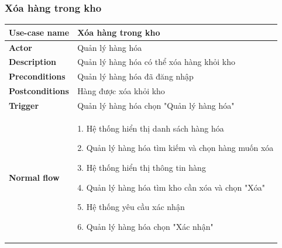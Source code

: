         \subsubsection{Xóa hàng trong kho}
        {
            \setlength\extrarowheight{6pt}
            \begin{longtable}{| p{} | p{} |} 
                \hline
                    \textbf{Use-case name} 
                & 
                    Xóa hàng trong kho
                \\
                \hline
                    \textbf{Actor} 
                & 
                    Quản lý hàng hóa
                \\
                \hline
                    \textbf{Description} 
                & 
                    Quản lý hàng hóa có thể xóa hàng khỏi kho
                \\
                \hline
                    \textbf{Preconditions} 
                &
                    Quản lý hàng hóa đã đăng nhập
                \\
                \hline
                    \textbf{Postconditions} 
                & 
                    Hàng được xóa khỏi kho
                \\
                \hline
                    \textbf{Trigger} 
                & 
                    Quản lý hàng hóa chọn "Quản lý hàng hóa"
                \\
                \hline
                \begin{flushleft}
                    \textbf{Normal flow}
                \end{flushleft}
                & 
                1. Hệ thống hiển thị danh sách hàng hóa
                    
                    2. Quản lý hàng hóa tìm kiếm và chọn hàng muốn xóa
                    
                    3. Hệ thống hiển thị thông tin hàng
                    
                    4. Quản lý hàng hóa tìm kho cần xóa và chọn "Xóa"
                    
                    5. Hệ thống yêu cầu xác nhận
                    
                    6. Quản lý hàng hóa chọn "Xác nhận"
                    

\end{longtable}}
